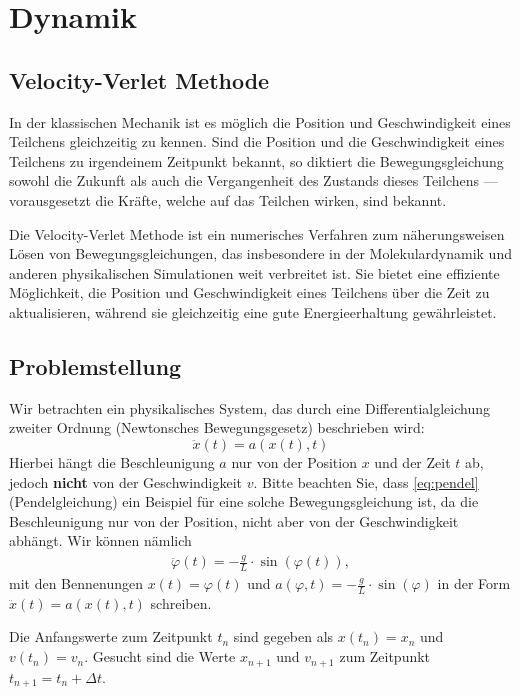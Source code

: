 \chapter{Dynamik}\label{ch:Dynamik}

\section{Velocity-Verlet Methode}
In der klassischen Mechanik ist es möglich die Position und Geschwindigkeit eines Teilchens gleichzeitig zu kennen. 
Sind die Position und die Geschwindigkeit eines Teilchens zu irgendeinem Zeitpunkt bekannt, so diktiert die Bewegungsgleichung sowohl die Zukunft als auch die Vergangenheit des Zustands dieses Teilchens --- vorausgesetzt die Kräfte, welche auf das Teilchen wirken, sind bekannt.

\par
Die Velocity-Verlet Methode ist ein numerisches Verfahren zum näherungsweisen Lösen von Bewegungsgleichungen, das insbesondere in der Molekulardynamik und anderen physikalischen Simulationen weit verbreitet ist. Sie bietet eine effiziente Möglichkeit, die Position und Geschwindigkeit eines Teilchens über die Zeit zu aktualisieren, während sie gleichzeitig eine gute Energieerhaltung gewährleistet.

\section{Problemstellung}
Wir betrachten ein physikalisches System, das durch eine Differentialgleichung zweiter Ordnung (Newtonsches Bewegungsgesetz) beschrieben wird:
\begin{equation}
    \ddot{x}(t) = a(x(t), t)
\end{equation}
Hierbei hängt die Beschleunigung $a$ nur von der Position $x$ und der Zeit $t$ ab, jedoch \textbf{nicht} von der Geschwindigkeit $v$. 
Bitte beachten Sie, dass \cref{eq:pendel} (Pendelgleichung) ein Beispiel für eine solche Bewegungsgleichung ist, da die Beschleunigung nur von der Position, nicht aber von der Geschwindigkeit abhängt. Wir können nämlich
\begin{align*}
  \ddot{\varphi} (t) = -\frac{g}{L}\cdot\sin(\varphi (t)),
\end{align*}
mit den Bennenungen $x(t) = \varphi(t)$ und $a(\varphi, t) = -\frac{g}{L}\cdot\sin(\varphi)$ in der Form $\ddot{x}(t) = a(x(t), t)$ schreiben.

\par
Die Anfangswerte zum Zeitpunkt $t_n$ sind gegeben als $x(t_n) = x_n$ und $v(t_n) = v_n$. Gesucht sind die Werte $x_{n+1}$ und $v_{n+1}$ zum Zeitpunkt $t_{n+1} = t_n + \Delta t$.

